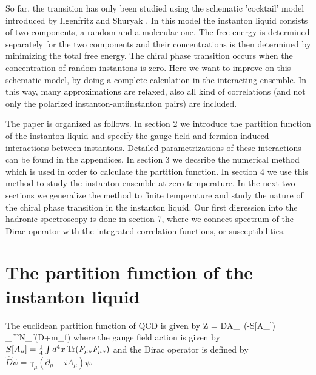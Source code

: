    So far, the transition has only been studied using the schematic
'cocktail' model introduced by Ilgenfritz and Shuryak \cite{IS_94}.
In this model the instanton liquid consists of two components, a random
and a molecular one. The free energy is determined separately for the
two components and their concentrations is then determined by minimizing
the total free energy. The chiral phase transition occurs when the
concentration of random instantons is zero. Here we want to improve
on this schematic model, by doing a complete calculation in the
interacting ensemble. In this way, many approximations are relaxed, also
all kind of correlations (and not only the polarized instanton-antiinstanton
pairs) are included.


   The paper is organized as follows. In section 2 we introduce the
partition function of the instanton liquid and specify the gauge
field and fermion induced interactions between instantons. Detailed
parametrizations of these interactions can be found in the appendices.
In section 3 we decsribe the numerical method which is used in order
to calculate the partition function. In section 4 we use this method
to study the instanton ensemble at zero temperature. In the next
two sections we generalize the method to finite temperature and
study the nature of the chiral phase transition in the instanton
liquid. Our first digression into the hadronic spectroscopy is done
in section 7, where we connect spectrum of the Dirac operator with
the integrated correlation functions, or susceptibilities.

\section{The partition function of the instanton liquid}

    The euclidean partition function of QCD is given by
\be
\label{Z_QCD}
  Z = \int DA_\mu\, \exp(-S[A_\mu])
          \prod_f^{N_f}\det(\hat D+m_f)
\ee
where the gauge field action is given by $S[A_\mu]=\frac{1}{4}
\int d^4x\, {\rm Tr}(F_{\mu\nu}F_{\mu\nu})$ and the Dirac operator
is defined by $\hat D\psi=\gamma_\mu(\partial_\mu -iA_\mu)\psi$.


